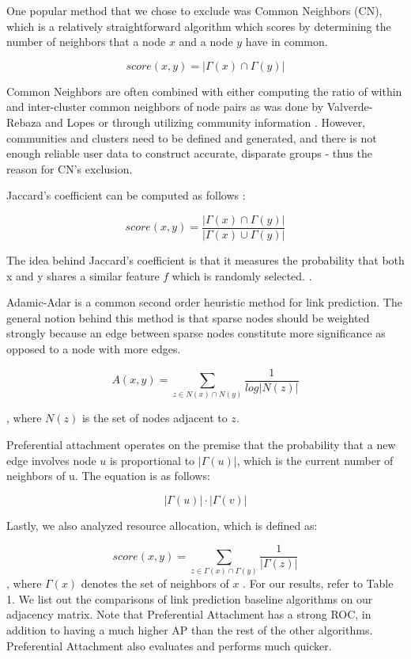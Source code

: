 \documentclass[10pt,twocolumn,letterpaper]{article}
\begin{document}
One popular method that we chose to exclude was Common Neighbors (CN), which is a relatively straightforward algorithm which scores by determining the number of neighbors that a node $x$ and a node $y$ have in common. \cite{link-prediction-social-network}

\[
score(x, y) = |\Gamma(x) \cap \Gamma(y)| 
\]

Common Neighbors are often combined with either computing the ratio of within and inter-cluster common neighbors of node pairs as was done by Valverde-Rebaza and Lopes \cite{within-cluster-common-neighbor} or through utilizing community information \cite{community-common-neighbor}. However, communities and clusters need to be defined and generated, and there is not enough reliable user data to construct accurate, disparate groups - thus the reason for CN's exclusion.

Jaccard's coefficient can be computed as follows \cite{link-prediction-social-network}:

\[
score(x, y) = \frac{|\Gamma(x) \cap \Gamma(y)| }{|\Gamma(x) \cup \Gamma(y)| }
\]

The idea behind Jaccard's coefficient is that it measures the probability that both x and y shares a similar feature $f$ which is randomly selected. \cite{link-prediction-social-network}.


Adamic-Adar is a common second order heuristic method for link prediction. The general notion behind this method is that sparse nodes should be weighted strongly because an edge between sparse nodes constitute more significance as opposed to a node with more edges. \cite{link-prediction-social-network} 


\[
    A(x, y) = \displaystyle\sum_{z \in N(x) \cap N(y)}^{} \frac{1}{log|N(z)|} 
\]

, where $N(z)$ is the set of nodes adjacent to $z$. \cite{link-prediction-social-network}

Preferential attachment operates on the premise that the probability that a new edge involves node $u$ is proportional to $|\Gamma(u)|$, which is the current number of neighbors of u. The equation is as follows:   

\[
    |\Gamma(u)|\cdot|\Gamma(v)|
\]

Lastly, we also analyzed resource allocation, which is defined as:

\[
    score(x, y) = \displaystyle\sum_{z \in \Gamma(x) \cap \Gamma(y)}^{} \frac{1}{|\Gamma(z)|} 
\]
, where $\Gamma(x)$ denotes the set of neighbors of $x$
.
For our results, refer to Table 1. We list out the comparisons of link prediction baseline algorithms on our adjacency matrix. Note that Preferential Attachment has a strong ROC, in addition to having a much higher AP than the rest of the other algorithms. Preferential Attachment also evaluates and performs much quicker. 
\end{document}
